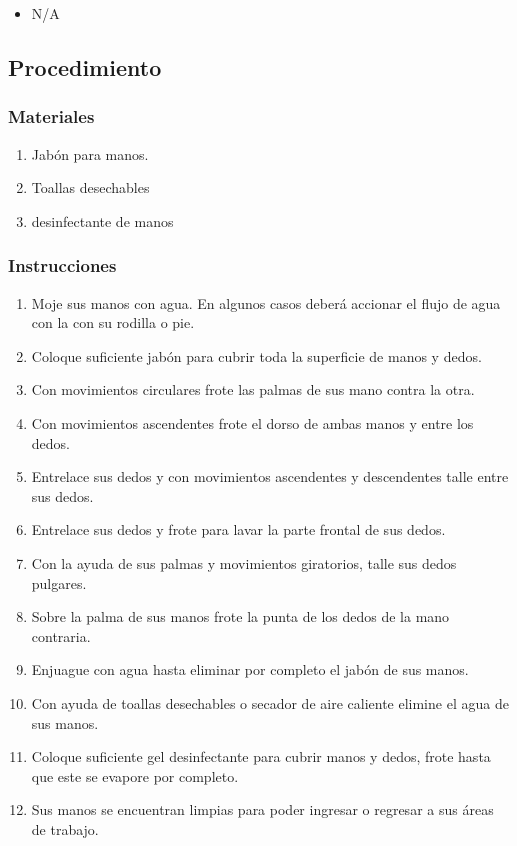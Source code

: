 \begin{itemize}
	\item N/A
\end{itemize}

\subsection{Procedimiento}

\subsubsection{Materiales}

\begin{enumerate}
	\item Jabón para manos.
	\item Toallas desechables
	\item desinfectante de manos
\end{enumerate}

\subsubsection{Instrucciones}

\begin{enumerate}
	\item Moje sus manos con agua. En algunos casos deberá accionar el flujo de agua con la con su rodilla o pie.
	\item Coloque suficiente jabón para cubrir toda la superficie de manos y dedos.
	\item Con movimientos circulares frote las palmas de sus mano contra la otra.
	\item Con movimientos ascendentes frote el dorso de ambas manos y entre los dedos.
	\item Entrelace sus dedos y con movimientos ascendentes y descendentes talle entre sus dedos.
	\item Entrelace sus dedos y frote para lavar la parte frontal de sus dedos.
	\item Con la ayuda de sus palmas y movimientos giratorios, talle sus dedos pulgares.
	\item Sobre la palma de sus manos frote la punta de los dedos de la mano contraria.
	\item Enjuague con agua hasta eliminar por completo el jabón de sus manos.
	\item Con ayuda de toallas desechables o secador de aire caliente elimine el agua de sus manos.
	\item Coloque suficiente gel desinfectante para cubrir manos y dedos, frote hasta que este se evapore por completo.
	\item Sus manos se encuentran limpias para poder ingresar o regresar a sus áreas de trabajo.
\end{enumerate}

